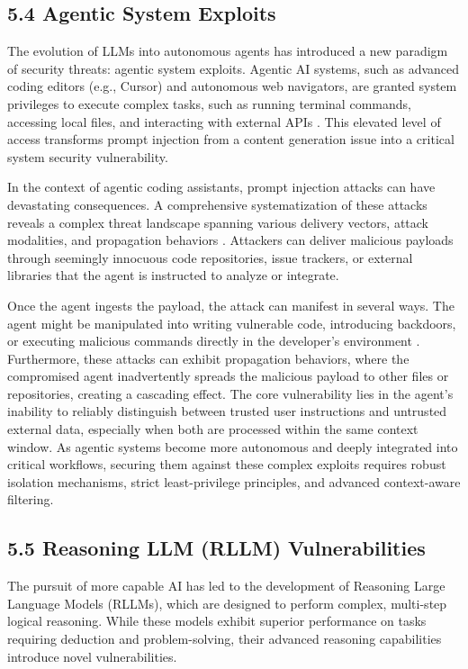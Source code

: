 \documentclass[11pt,a4paper]{article}
\begin{document}
\subsection{5.4 Agentic System Exploits}
The evolution of LLMs into autonomous agents has introduced a new paradigm of security threats: agentic system exploits. Agentic AI systems, such as advanced coding editors (e.g., Cursor) and autonomous web navigators, are granted system privileges to execute complex tasks, such as running terminal commands, accessing local files, and interacting with external APIs \cite{Liu_2025_AI}. This elevated level of access transforms prompt injection from a content generation issue into a critical system security vulnerability.

In the context of agentic coding assistants, prompt injection attacks can have devastating consequences. A comprehensive systematization of these attacks reveals a complex threat landscape spanning various delivery vectors, attack modalities, and propagation behaviors \cite{Maloyan_2026_Prompt}. Attackers can deliver malicious payloads through seemingly innocuous code repositories, issue trackers, or external libraries that the agent is instructed to analyze or integrate.

Once the agent ingests the payload, the attack can manifest in several ways. The agent might be manipulated into writing vulnerable code, introducing backdoors, or executing malicious commands directly in the developer's environment \cite{Liu_2025_AI}. Furthermore, these attacks can exhibit propagation behaviors, where the compromised agent inadvertently spreads the malicious payload to other files or repositories, creating a cascading effect. The core vulnerability lies in the agent's inability to reliably distinguish between trusted user instructions and untrusted external data, especially when both are processed within the same context window. As agentic systems become more autonomous and deeply integrated into critical workflows, securing them against these complex exploits requires robust isolation mechanisms, strict least-privilege principles, and advanced context-aware filtering.

\subsection{5.5 Reasoning LLM (RLLM) Vulnerabilities}
The pursuit of more capable AI has led to the development of Reasoning Large Language Models (RLLMs), which are designed to perform complex, multi-step logical reasoning. While these models exhibit superior performance on tasks requiring deduction and problem-solving, their advanced reasoning capabilities introduce novel vulnerabilities.
\end{document}
